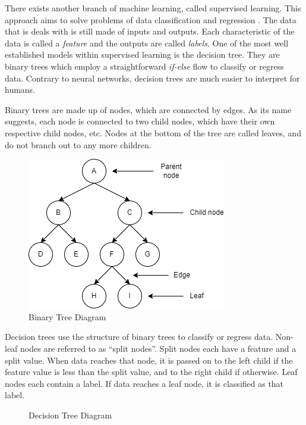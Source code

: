 \documentclass[12pt]{article}
\begin{document}
There exists another branch of machine learning, called supervised learning. This approach aims to solve problems of data classification and regression \cite{Supervised_unsupervised_learning}. The data that is deals with is still made of inputs and outputs. Each characteristic of the data is called a \textit{feature} and the outputs are called \textit{labels}. One of the most well established models within supervised learning is the decision tree. They are binary trees which employ a straightforward \textit{if-else} flow to classify or regress data. Contrary to neural networks, decision trees are much easier to interpret for humans.

Binary trees are made up of nodes, which are connected by edges. As its name suggests, each node is connected to two child nodes, which have their own respective child nodes, etc. Nodes at the bottom of the tree are called leaves, and do not branch out to any more children.

\begin{figure}[H]
    \centering
    \includegraphics[scale=0.6]{figs/binary_tree.png}
    \caption{Binary Tree Diagram}
    \label{fig:binarytree}
\end{figure}

Decision trees use the structure of binary trees to classify or regress data. Non-leaf nodes are referred to as ``split nodes''. Split nodes each have a feature and a split value. When data reaches that node, it is passed on to the left child if the feature value is less than the split value, and to the right child if otherwise. Leaf nodes each contain a label. If data reaches a leaf node, it is classified as that label.

\begin{figure}[H]
    \centering
    \caption{Decision Tree Diagram}
    \label{fig:decisiontree}
\end{figure}
\end{document}
